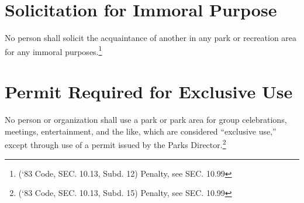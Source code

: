 \section{Solicitation for Immoral Purpose}
No person shall solicit the acquaintance of another in any park or recreation area for any immoral purposes.\footnote{(‘83 Code, SEC. 10.13, Subd. 12)  Penalty, see SEC. 10.99}

\section{Permit Required for Exclusive Use}
No person or organization shall use a park or park area for group celebrations, meetings, entertainment, and the like, which are considered “exclusive use,” except through use of a permit issued by the Parks Director.\footnote{(‘83 Code, SEC. 10.13, Subd. 15)  Penalty, see SEC. 10.99}
